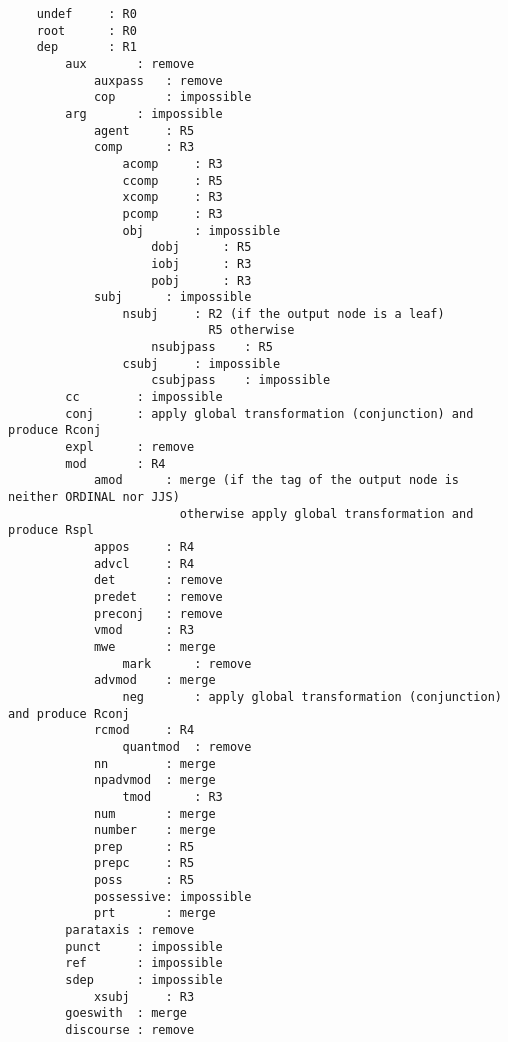 \footnotesize{\begin{verbatim}
    undef     : R0
    root      : R0
    dep       : R1
        aux       : remove
            auxpass   : remove
            cop       : impossible
        arg       : impossible
            agent     : R5
            comp      : R3
                acomp     : R3
                ccomp     : R5
                xcomp     : R3
                pcomp     : R3
                obj       : impossible
                    dobj      : R5
                    iobj      : R3
                    pobj      : R3
            subj      : impossible
                nsubj     : R2 (if the output node is a leaf) 
                            R5 otherwise
                    nsubjpass    : R5
                csubj     : impossible
                    csubjpass    : impossible
        cc        : impossible
        conj      : apply global transformation (conjunction) and produce Rconj
        expl      : remove
        mod       : R4
            amod      : merge (if the tag of the output node is neither ORDINAL nor JJS) 
                        otherwise apply global transformation and produce Rspl
            appos     : R4
            advcl     : R4
            det       : remove
            predet    : remove
            preconj   : remove
            vmod      : R3
            mwe       : merge
                mark      : remove
            advmod    : merge
                neg       : apply global transformation (conjunction) and produce Rconj
            rcmod     : R4
                quantmod  : remove
            nn        : merge
            npadvmod  : merge
                tmod      : R3
            num       : merge
            number    : merge
            prep      : R5
            prepc     : R5
            poss      : R5
            possessive: impossible
            prt       : merge
        parataxis : remove
        punct     : impossible
        ref       : impossible
        sdep      : impossible
            xsubj     : R3
        goeswith  : merge
        discourse : remove
\end{verbatim}}